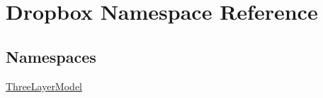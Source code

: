 \hypertarget{namespaceDropbox}{\section{Dropbox Namespace Reference}
\label{namespaceDropbox}
}
\subsection*{Namespaces}
\begin{DoxyCompactItemize}
\item 
 \hyperlink{namespaceDropbox_1_1ThreeLayerModel}{Three\+Layer\+Model}
\end{DoxyCompactItemize}
